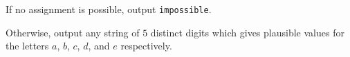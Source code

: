 


If no assignment is possible, output \texttt{impossible}.

Otherwise, output any string of $5$ distinct digits which gives plausible values for
the letters $a$, $b$, $c$, $d$, and $e$ respectively.
